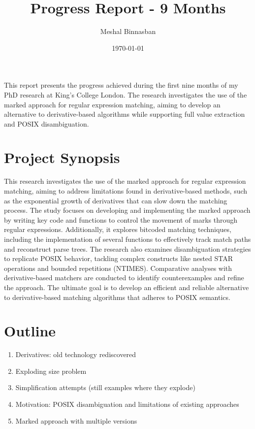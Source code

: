 \documentclass[11pt]{article}
\title{Progress Report - 9 Months}
\author{Meshal Binnasban}
\date{\today}
\begin{document}
\maketitle

This report presents the progress achieved during the first nine months of my PhD research at King's College London. The research investigates the use of the marked approach for regular expression matching, aiming to develop an alternative to derivative-based algorithms while supporting full value extraction and POSIX disambiguation.

\section*{Project Synopsis}

This research investigates the use of the marked approach for regular expression matching, aiming to address limitations found in derivative-based methods, such as the exponential growth of derivatives that can slow down the matching process. The study focuses on developing and implementing the marked approach by writing key code and functions to control the movement of marks through regular expressions. Additionally, it explores bitcoded matching techniques, including the implementation of several functions to effectively track match paths and reconstruct parse trees. The research also examines disambiguation strategies to replicate POSIX behavior, tackling complex constructs like nested STAR operations and bounded repetitions (NTIMES). Comparative analyses with derivative-based matchers are conducted to identify counterexamples and refine the approach. The ultimate goal is to develop an efficient and reliable alternative to derivative-based matching algorithms that adheres to POSIX semantics.

\section{Outline}

\begin{enumerate}
    \item Derivatives: old technology rediscovered
    \item Exploding size problem
    \item Simplification attempts (still examples where they explode)
    \item Motivation: POSIX disambiguation and limitations of existing approaches
    \item Marked approach with multiple versions
\end{enumerate}
\end{document}
